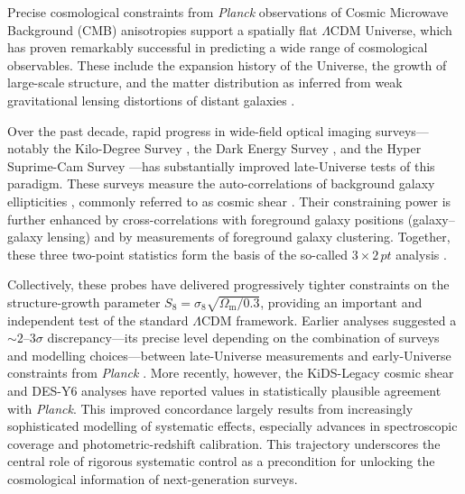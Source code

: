 Precise cosmological constraints from \textit{Planck} observations of Cosmic Microwave Background (CMB) anisotropies \citep{2020A&A...641A...6P} support a spatially flat \(\Lambda\)CDM Universe, which has proven remarkably successful in predicting a wide range of cosmological observables. These include the expansion history of the Universe, the growth of large-scale structure, and the matter distribution as inferred from weak gravitational lensing distortions of distant galaxies \citep{1972gcpa.book.....W, 1980lssu.book.....P, 1990ApJ...349L...1T, 1998ApJ...498...26K}.

Over the past decade, rapid progress in wide-field optical imaging surveys---notably the Kilo-Degree Survey \citep[KiDS;][]{2019A&A...625A...2K, 2024A&A...686A.170W}, the Dark Energy Survey \citep[DES;][]{2025arXiv250105665Y, 2025arXiv250105739B}, and the Hyper Suprime-Cam Survey \citep[HSC;][]{2022PASJ...74..247A, 2022PASJ...74..421L}---has substantially improved late-Universe tests of this paradigm. These surveys measure the auto-correlations of background galaxy ellipticities \citep{2021A&A...645A.104A, 2022PhRvD.105b3514A, 2022PhRvD.105b3515S, 2023A&A...679A.133L, 2023PhRvD.108l3519D, 2023PhRvD.108l3518L}, commonly referred to as cosmic shear \citep{2001PhR...340..291B, 2015RPPh...78h6901K}. Their constraining power is further enhanced by cross-correlations with foreground galaxy positions (galaxy--galaxy lensing) and by measurements of foreground galaxy clustering. Together, these three two-point statistics form the basis of the so-called \(\mathit{3 \times 2 \, pt}\) analysis \citep{2021A&A...646A.140H, 2022PhRvD.105b3520A, 2023A&A...675A.189D, 2023PhRvD.108l3521S, 2023PhRvD.108l3517M}.

Collectively, these probes have delivered progressively tighter constraints on the structure-growth parameter \(S_8 = \sigma_8 \sqrt{\Omega_\text{m}/0.3}\), providing an important and independent test of the standard \(\Lambda\)CDM framework. Earlier analyses suggested a \(\sim2\)--\(3\sigma\) discrepancy---its precise level depending on the combination of surveys and modelling choices---between late-Universe measurements and early-Universe constraints from \textit{Planck} \citep{2023OJAp....6E..36D, 2023MNRAS.518..477A, 2023MNRAS.520.5016L, 2023A&A...675A.189D, 2023PhRvD.108l3519D, 2024JCAP...08..024G}. More recently, however, the KiDS-Legacy cosmic shear \citep{2025arXiv250319442S, 2025arXiv250319441W} and DES-Y6 analyses \citep{2026arXiv260210065D, 2026arXiv260114559D} have reported values in statistically plausible agreement with \textit{Planck}. This improved concordance largely results from increasingly sophisticated modelling of systematic effects, especially advances in spectroscopic coverage and photometric-redshift calibration. This trajectory underscores the central role of rigorous systematic control as a precondition for unlocking the cosmological information of next-generation surveys.

